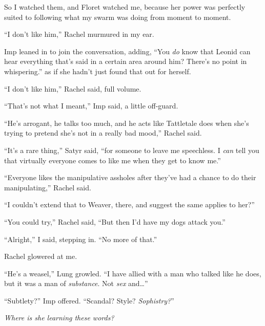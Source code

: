 So I watched them, and Floret watched me, because her power was perfectly suited to following what my swarm was doing from moment to moment.



``I don't like him,'' Rachel murmured in my ear.



Imp leaned in to join the conversation, adding, ``You \emph{do} know that Leonid can hear everything that's said in a certain area around him?  There's no point in whispering.'' as if she hadn't just found that out for herself.



``I don't like him,'' Rachel said, full volume.



``That's not what I meant,'' Imp said, a little off-guard.



``He's arrogant, he talks too much, and he acts like Tattletale does when she's trying to pretend she's not in a really bad mood,'' Rachel said.



``It's a rare thing,'' Satyr said, ``for someone to leave me speechless.  I \emph{can} tell you that virtually everyone comes to like me when they get to know me.''



``Everyone likes the manipulative assholes after they've had a chance to do their manipulating,'' Rachel said.



``I couldn't extend that to Weaver, there, and suggest the same applies to her?''



``You could try,'' Rachel said, ``But then I'd have my dogs attack you.''



``Alright,'' I said, stepping in.  ``No more of that.''



Rachel glowered at me.



``He's a weasel,'' Lung growled.  ``I have allied with a man who talked like he does, but it was a man of \emph{substance}.  Not \emph{sex} and\ldots''



``Subtlety?'' Imp offered.  ``Scandal?  Style?  \emph{Sophistry?}''



\emph{Where is she learning these words?}



